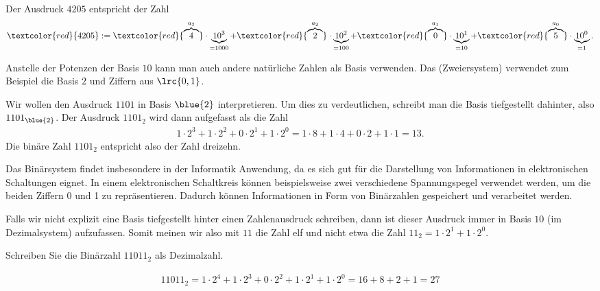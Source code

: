 \begin{myexample}
Der Ausdruck $4205$ entspricht der Zahl
\begin{align*}
	\textcolor{red}{4205} := \textcolor{red}{\overbrace{4}^{a_3}}\cdot \underbrace{10^3}_{=1000} + \textcolor{red}{\overbrace{2}^{a_2}}\cdot \underbrace{10^2}_{=100} + \textcolor{red}{\overbrace{0}^{a_1}}\cdot \underbrace{10^1}_{=10} + \textcolor{red}{\overbrace{5}^{a_0}}\cdot \underbrace{10^0}_{=1}.
\end{align*}
\end{myexample}

Anstelle der Potenzen der Basis $10$ kann man auch andere natürliche Zahlen als Basis verwenden.
Das  (Zweiersystem) verwendet zum Beispiel die Basis $2$ und
Ziffern aus $\lrc{0,1}$.
\begin{myexample}
Wir wollen den Ausdruck $1101$ in Basis $\blue{2}$ interpretieren. Um dies zu verdeutlichen, schreibt man die Basis
tiefgestellt dahinter, also $1101_{\blue{2}}$. Der Ausdruck $1101_2$ wird dann aufgefasst als die Zahl
\begin{align*}
	1\cdot 2^3 + 1\cdot 2^2 + 0\cdot 2^1 + 1\cdot 2^0 = 1\cdot 8 + 1\cdot 4 + 0\cdot 2 + 1\cdot 1 = 13.
\end{align*}
Die binäre Zahl $1101_2$ entspricht also der Zahl dreizehn.
\end{myexample}

Das Binärsystem findet insbesondere in der Informatik Anwendung, da es sich gut für die Darstellung von Informationen in elektronischen Schaltungen eignet. In einem elektronischen Schaltkreis können beispielsweise zwei verschiedene Spannungspegel verwendet werden, um die beiden Ziffern 0 und 1 zu repräsentieren. Dadurch können Informationen in Form von Binärzahlen gespeichert und verarbeitet werden.

\begin{myattention}
	Falls wir nicht explizit eine Basis tiefgestellt hinter einen Zahlenausdruck schreiben, dann ist dieser Ausdruck immer in Basis $10$ (im
	Dezimalsystem) aufzufassen. Somit meinen wir also mit $11$ die Zahl elf und nicht etwa die Zahl $11_2 = 1\cdot 2^1 +
		1\cdot 2^0$.
\end{myattention}

\begin{myexercise}
	Schreiben Sie die Binärzahl $11011_2$ als Dezimalzahl.
	\begin{myanswer}
		\begin{align*}
			11011_2 = 1\cdot 2^4 + 1\cdot 2^3 + 0\cdot 2^2 + 1\cdot 2^1 + 1\cdot 2^0 = 16 + 8 + 2 + 1 = 27
		\end{align*}
	\end{myanswer}
\end{myexercise}

